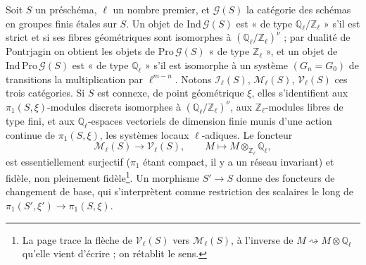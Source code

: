 \documentclass[11pt,a4paper]{article}
\begin{document}
Soit $S$ un préschéma, $\ell$ un nombre premier, et $\mathcal{G}(S)$ la catégorie
des schémas en groupes finis étales sur $S$. Un objet de
$\mathrm{Ind}\,\mathcal{G}(S)$ est « de type $\mathbb{Q}_\ell/\mathbb{Z}_\ell$ »
s'il est strict et si ses fibres géométriques sont isomorphes à
$(\mathbb{Q}_\ell/\mathbb{Z}_\ell)^{\nu}$ ; par dualité de Pontrjagin on obtient les
objets de $\mathrm{Pro}\,\mathcal{G}(S)$ « de type $\mathbb{Z}_\ell$ », et un objet
de $\mathrm{Ind}\,\mathrm{Pro}\,\mathcal{G}(S)$ est « de type $\mathbb{Q}_\ell$ »
s'il est isomorphe à un système $(G_n = G_0)$ de transitions la multiplication
par $\ell^{m-n}$. Notons $\mathcal{I}_\ell(S)$, $\mathcal{M}_\ell(S)$,
$\mathcal{V}_\ell(S)$ ces trois catégories. Si $S$ est connexe, de point
géométrique $\xi$, elles s'identifient aux $\pi_1(S, \xi)$-modules discrets
isomorphes à $(\mathbb{Q}_\ell/\mathbb{Z}_\ell)^{\nu}$, aux $\mathbb{Z}_\ell$-modules
libres de type fini, et aux $\mathbb{Q}_\ell$-espaces vectoriels de dimension finie
munis d'une action continue de $\pi_1(S, \xi)$, les systèmes locaux
$\ell$-adiques. Le foncteur
\[
\mathcal{M}_\ell(S) \longrightarrow \mathcal{V}_\ell(S),
\qquad M \mapsto M \otimes_{\mathbb{Z}_\ell} \mathbb{Q}_\ell,
\]
est essentiellement surjectif ($\pi_1$ étant compact, il y a un réseau invariant)
et fidèle, non pleinement fidèle\footnote{La page trace la flèche de
$\mathcal{V}_\ell(S)$ vers $\mathcal{M}_\ell(S)$, à l'inverse de $M
\rightsquigarrow M \otimes \mathbb{Q}_\ell$ qu'elle vient d'écrire ; on rétablit le
sens.}. Un morphisme $S' \to S$ donne des foncteurs de changement de base, qui
s'interprètent comme restriction des scalaires le long de $\pi_1(S', \xi') \to
\pi_1(S, \xi)$.
\end{document}
